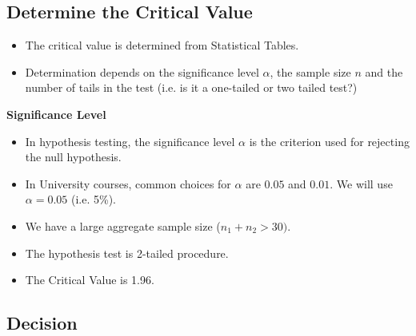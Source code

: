 \documentclass[a4paper,12pt]{article}
\begin{document}
\subsection*{Determine the Critical Value}

\begin{itemize}
\item The critical value is determined from Statistical Tables.
\item Determination depends on the significance level $\alpha$, the sample size $n$ and the number of tails in the test (i.e. is it a one-tailed or two tailed test?)
\end{itemize}

\noindent \textbf{Significance Level}

\begin{itemize}
\item In hypothesis testing, the significance level $\alpha$ is the criterion used for rejecting the null hypothesis. 

\item In University courses, common choices for $\alpha$ are $0.05$ and $0.01$. We will use $\alpha =0.05$ (i.e. 5\%).
\item We have a large aggregate sample size ($n_1 + n_2 > 30)$.
\item The hypothesis test is 2-tailed procedure.
\item The Critical Value is 1.96.
\end{itemize}



\newpage 
\subsection*{Decision}
\end{document}
